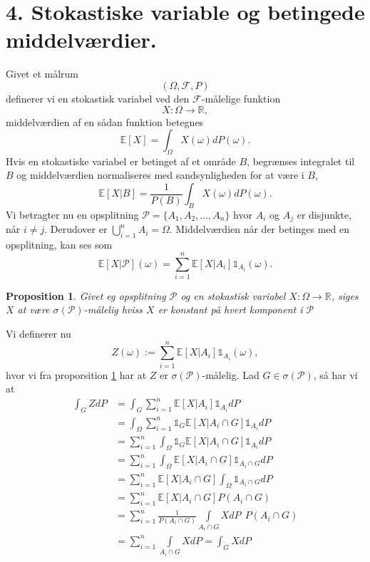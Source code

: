 \documentclass[12pt]{report}
\newtheorem{proposition}[lemma]{Proposition}
\theoremstyle{break}
\theoremstyle{break}
\newcommand{\RR}{\mathbb{R}}
\newcommand{\EE}{\mathbb{E}}
\newcommand{\FI}{\mathcal{F}}
\newcommand{\PI}{\mathcal{P}}
\newcommand{\1}{\mathds{1}}
\begin{document}
\section*{4. Stokastiske variable og betingede middelværdier.}
Givet et målrum \[(\Omega, \FI, P)\] definerer vi en stokastisk variabel ved den $\FI$-målelige funktion \[ X\colon\Omega \to  \RR,\] middelværdien af en sådan funktion betegnes \[ \EE\left[X\right]=\int_{\Omega} X(\omega)dP(\omega).\] Hvis en stokastiske variabel er betinget af et område $B$, begrænses integralet til $B$ og middelværdien normaliseres med sandsynligheden for at være i $B$, \[ \EE\left[X\vert B\right]=\frac{1}{P(B)}\int_{B} X(\omega)dP(\omega). \]
Vi betragter nu en opsplitning $\PI=\{A_1,A_2,...,A_n\}$ hvor $A_i$ og $A_j$ er disjunkte, når $i\neq j$. Derudover er $\bigcup\limits_{i=1}^{n} A_i=\Omega$. Middelværdien når der betinges med en opsplitning, kan ses som \[ \EE\left[X\vert \PI\right](\omega)=\sum\limits_{i=1}^{n} \EE\left[X\vert A_i\right]\1_{A_i}(\omega). \]
\begin{proposition}\label{prop:measurable_if_constant}
	Givet eg opsplitning $\PI$ og en stokastisk variabel $X\colon \Omega\to\RR$, siges $X$ at være $\sigma(\PI)$-målelig hviss $X$ er konstant på hvert komponent i $\PI$
\end{proposition}
Vi definerer nu \[ Z(\omega):=\sum\limits_{i=1}^{n} \EE\left[X\vert A_i\right]\1_{A_i}(\omega), \] hvor vi fra proporsition \ref{prop:measurable_if_constant} har at $Z$ er $\sigma(\PI)$-målelig. Lad $G\in \sigma(\PI)$, så har vi at
\begin{align*}
	\int_G ZdP&=\int_G\sum\limits_{i=1}^{n} \EE\left[X\vert A_i\right]\1_{A_i}dP \\
	&=\int_\Omega\sum\limits_{i=1}^{n} \1_G\EE\left[X\vert A_i\cap G\right]\1_{A_i}dP\\
	&=\sum\limits_{i=1}^{n} \int_\Omega \1_G\EE\left[X\vert A_i\cap G\right]\1_{A_i}dP\\
	&=\sum\limits_{i=1}^{n} \int_\Omega \EE\left[X\vert A_i\cap G\right]\1_{A_i\cap G}dP\\
	&=\sum\limits_{i=1}^{n} \EE\left[X\vert A_i\cap G\right]\int_\Omega \1_{A_i\cap G}dP\\
	&=\sum\limits_{i=1}^{n} \EE\left[X\vert A_i\cap G\right]P(A_i\cap G)\\
	&=\sum\limits_{i=1}^{n} \frac{1}{P(A_i\cap G)} \int\limits_{A_i\cap G}XdP~~ P(A_i\cap G)\\
	&=\sum\limits_{i=1}^{n} \int\limits_{A_i\cap G}XdP=\int_G X dP\\
\end{align*}
\end{document}
